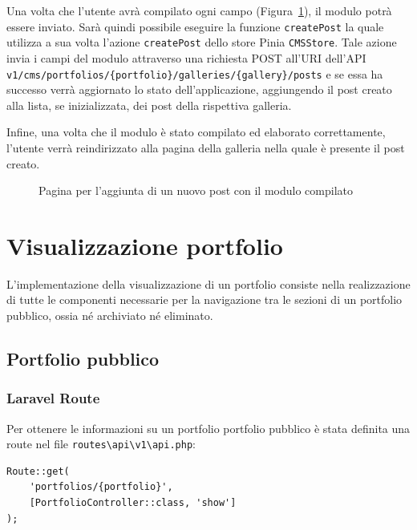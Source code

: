 Una volta che l'utente avr\`a compilato ogni campo (Figura~\ref{fig:cms-p-new1}), il modulo potr\`a essere inviato. Sar\`a quindi possibile eseguire la funzione \verb|createPost| la quale utilizza a sua volta l'azione \verb|createPost| dello store Pinia \verb|CMSStore|. Tale azione invia i campi del modulo attraverso una richiesta POST all'URI dell'API \verb|v1/cms/portfolios/{portfolio}/galleries/{gallery}/posts| e se essa ha successo verr\`a aggiornato lo stato dell'applicazione, aggiungendo il post creato alla lista, se inizializzata, dei post della rispettiva galleria.

Infine, una volta che il modulo \`e stato compilato ed elaborato correttamente, l'utente verr\`a reindirizzato alla pagina della galleria nella quale \`e presente il post creato.


\begin{figure}[htbp]
	\centering
	\fboxsep=0.5pt
	\fboxrule=0.5pt
	\caption{Pagina per l'aggiunta di un nuovo post con il modulo compilato}
	\label{fig:cms-p-new1}
\end{figure}

\section{Visualizzazione portfolio}
L'implementazione della visualizzazione di un portfolio consiste nella realizzazione di tutte le componenti necessarie per la navigazione tra le sezioni di un portfolio pubblico, ossia n\'e archiviato n\'e eliminato.
\subsection{Portfolio pubblico}
\subsubsection{Laravel Route}
Per ottenere le informazioni su un portfolio portfolio pubblico \`e stata definita una route nel file \verb|routes\api\v1\api.php|:
\begin{lstlisting}[caption={Route per ottenere un portfolio pubblico}, label={lst:route_public_portfolio}]
Route::get(
	'portfolios/{portfolio}', 
	[PortfolioController::class, 'show']
);
\end{lstlisting}

